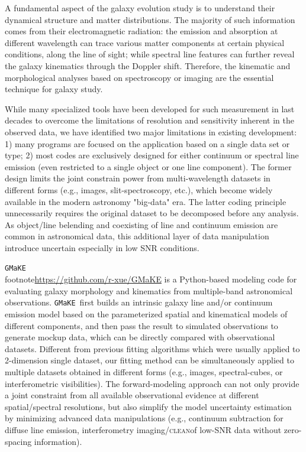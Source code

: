 \documentclass[twocolumn,tighten]{aastex62}
\newcommand{\gmake}{{\tt GMaKE}}
\newcommand{\clean}{{\scshape clean}}
\begin{document}


A fundamental aspect of the galaxy evolution study is to understand their dynamical structure and matter distributions. 
The majority of such information comes from their electromagnetic radiation: the emission and absorption at different wavelength can trace various matter components at certain physical conditions, along the line of sight; while spectral line features can further reveal the galaxy kinematics through the Doppler shift.
Therefore, the kinematic and morphological analyses based on spectroscopy or imaging are the essential technique for galaxy study.


While many specialized tools have been developed for such measurement in last decades to overcome the limitations of resolution and sensitivity inherent in the observed data, we have identified two major limitations in existing development: 1) many programs are focused on the application based on a single data set or type;
2) most codes are exclusively designed for either continuum or spectral line emission (even restricted to a single object or one line component).
The former design limits the joint constrain power from multi-wavelength datasets in different forms (e.g., images, slit-spectroscopy, etc.), which become widely available in the modern astronomy "big-data" era. 
The latter coding principle unnecessarily requires the original dataset to be decomposed before any analysis. As object/line belending and coexisting of line and continuum emission are common in astronomical data, this additional layer of data manipulation introduce uncertain especially in low SNR conditions.

\gmake\\footnote{\url{https://github.com/r-xue/GMaKE}} is a Python-based modeling code for evaluating galaxy morphology and kinematics 
from multiple-band astronomical observations.
\gmake\ first builds an intrinsic galaxy line and/or continuum emission model based on the parameterized spatial and kinematical models of different components, and then pass the result to simulated observations to generate mockup data, which can be directly compared with observational datasets.
Different from previous fitting algorithms which were usually applied to 2-dimension single dataset, our fitting method can be simultaneously applied to multiple datasets obtained in different forms (e.g., images, spectral-cubes, or interferometric visibilities).
The forward-modeling approach can not only provide a joint constraint from all available observational evidence at different spatial/spectral resolutions, but also simplify the model uncertainty estimation by minimizing advanced data manipulations (e.g., continuum subtraction for diffuse line emission, interferometry imaging/\clean of low-SNR data without zero-spacing information).
\end{document}

